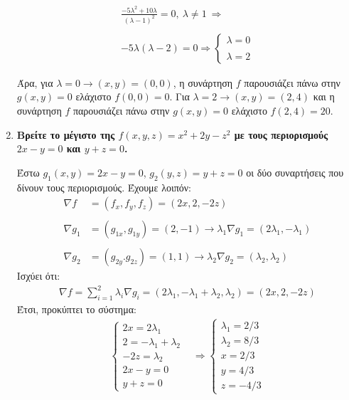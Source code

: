 \begin{enumerate}
        \begin{align*}
            \frac{-5\lambda^2 + 10 \lambda}{(\lambda - 1)^2} = 0, \ \lambda \neq 1 \ \Rightarrow \\\\
            -5\lambda (\lambda - 2 ) = 0 \Rightarrow \begin{cases} \lambda = 0 \\\\ \lambda = 2 \end{cases}
        \end{align*}
    
      Άρα, για $\lambda = 0 \longrightarrow (x,y) = (0,0)$, η συνάρτηση $f$ παρουσιάζει πάνω στην $g(x,y) = 0$ ελάχιστο $f(0,0) = 0$. Για $\lambda = 2 \longrightarrow (x,y) = (2,4)$ και η συνάρτηση $f$ παρουσιάζει πάνω στην $g(x,y) = 0$ ελάχιστο $f(2,4) = 20$.
    
    \item \textbf{Βρείτε το μέγιστο της $f(x,y,z) = x^2 + 2y - z^2$ με τους περιορισμούς $2x-y=0$ και $y+z=0$.}
    
        Έστω $g_1(x,y) = 2x-y = 0$, $g_2(y,z) = y+z = 0$ οι δύο συναρτήσεις που δίνουν τους περιορισμούς. Έχουμε λοιπόν:
        \begin{align*}
            \nabla f & = (f_x, f_y, f_z) = (2x, 2, -2z) \\\\
            \nabla g_1 & = (g_{1x}, g_{1y}) = (2, -1) \longrightarrow \lambda_1 \nabla g_1 = (2\lambda_1, - \lambda_1) \\\\
            \nabla g_2 & = (g_{2y}. g_{2z}) = (1,1) \longrightarrow \lambda_2 \nabla g_2 = (\lambda_2, \lambda_2)
        \end{align*}
        Ισχύει ότι:
        \begin{align*}
            \nabla f = \sum_{i=1}^{2} \lambda_i \nabla g_i = (2\lambda_1, -\lambda_1 + \lambda_2, \lambda_2) = (2x, 2, -2z)
        \end{align*}
        Έτσι, προκύπτει το σύστημα:
        \begin{align*}
            \begin{cases}
                2x = 2\lambda_1 \\
                2 = - \lambda_1 + \lambda_2 \\
                -2z = \lambda_2 \\
                2x-y = 0 \\
                y+z = 0
            \end{cases} & \Rightarrow
            \begin{cases}
                \lambda_1  = 2/3 \\
                \lambda_2 = 8/3 \\
                x = 2/3 \\
                y = 4/3 \\
                z = -4/3
            \end{cases}
        \end{align*}
        

\end{enumerate}
